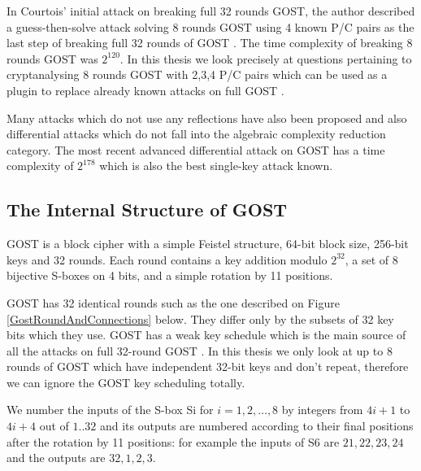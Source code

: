 In Courtois' initial attack on breaking full 32 rounds GOST, the author described a guess-then-solve attack solving 8 rounds GOST using 4 known P/C pairs as the last step of breaking full 32 rounds of GOST \cite{gostreport}. The time complexity of breaking 8 rounds GOST was $2^{120}$. In this thesis we look precisely at questions pertaining to cryptanalysing 8 rounds GOST with 2,3,4 P/C pairs which can be used as a plugin to replace already known attacks on full GOST \cite{gostreport,gostac,gostlow8r}. 

Many attacks which do not use any reflections
have also been proposed \cite{gostac,gostreport,DunkelmanImprovedGOST8R}
and also differential attacks which do not
fall into the algebraic complexity reduction category.
The most recent advanced differential attack on GOST
has a time complexity of $2^{178}$ \cite{gostdc0,gostdc2}
which is also the best single-key attack known.

\subsection{The Internal Structure of GOST}
GOST is a block cipher with a simple Feistel structure,
64-bit block size, 256-bit keys and 32 rounds.
Each round contains a key addition modulo $2^{32}$,
a set of 8 bijective S-boxes on 4 bits,
and a simple rotation by 11 positions.

GOST has 32 identical rounds such as the one described on Figure \ref{GostRoundAndConnections} below.
They differ only by the subsets of 32 key bits which they use. GOST has a weak key schedule which is the main source of all the attacks on full 32-round GOST \cite{gostreport,gostac,JapaneseGOSTMITMFSE2011,gostdcpp1,gostdc0,gostdc1,gostdc2,DunkelmanImprovedGOST8R}.  
In this thesis we only look at up to 8 rounds of GOST which have independent 32-bit keys and don't repeat, therefore we can ignore the GOST key scheduling totally.

We number the inputs of the S-box Si for $i=1,2,\ldots,8$ by integers from $4i+1$ to $4i+4$ out of $1..32$ and its outputs are numbered according to their final positions after the rotation by 11 positions: for example the inputs of S6 are $21,22,23,24$ and the outputs are $32,1,2,3$.


